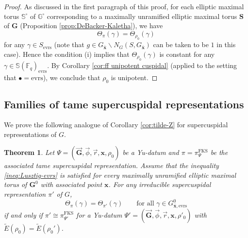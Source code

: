 \documentclass{amsart}
\newcommand{\evrs}{\mathrm{evrs}}
\newcommand{\FKS}{\mathrm{FKS}}
\newcommand{\x}{\mathbf{x}}
\newcommand{\F}{\mathbb{F}}
\newcommand{\bbS}{\mathbb{S}}
\newcommand{\bbG}{\mathbb{G}}
\newcommand{\bfG}{\mathbf{G}}
\newcommand{\bfS}{\mathbf{S}}
\theoremstyle{plain}
\newtheorem{theorem}[thm]{Theorem}
\theoremstyle{definition}
\theoremstyle{remark}
\theoremstyle{theorem}
\begin{document}
\begin{proof}
As discussed in the first paragraph of this proof, for each elliptic maximal torus $\bbS^{\circ}$ of $\bbG^{\circ}$ corresponding to a maximally unramified elliptic maximal torus $\bfS$ of $\bfG$ (Proposition \ref{prop:DeBacker-Kaletha}), we have
\[
\Theta_{\pi}(\gamma)
=
\Theta_{\rho_{0}}(\gamma)
\]
for any $\gamma\in S_{\evrs}$ (note that $g\in G_{\bar{\x}}\backslash N_{G}(S,G_{\bar{\x}})$ can be taken to be $1$ in this case).
Hence the condition (i) implies that $\Theta_{\rho_{0}}(\gamma)$ is constant for any $\gamma\in\bbS(\F_{q})_{\evrs}$.
By Corollary \ref{cor:ff unipotent cuspidal} (applied to the setting that $\bullet = \evrs$), we conclude that $\rho_{0}$ is unipotent.
\end{proof}

\subsection{Families of tame supercuspidal representations}

We prove the following analogue of Corollary \ref{cor:tilde-Z} for supercuspidal representations of $G$.

\begin{theorem}\label{thm:p-adic E}
Let $\Psi=(\vec{\bfG},\vec{\phi},\vec{r},\x,\rho_{0})$ be a Yu-datum and $\pi=\pi_{\Psi}^{\FKS}$ be the associated tame supercuspidal representation.
Assume that the inequality \eqref{ineq:Lusztig-evrs} is satisfied for every maximally unramified elliptic maximal torus of $\bfG^{0}$ with associated point $\x$.
For any irreducible supercuspidal representation $\pi'$ of $G$, 
\begin{equation*}
\Theta_\pi(\gamma) = \Theta_{\pi'}(\gamma) \qquad \text{for all $\gamma\in G^{0}_{\bar{\x},\evrs}$}
\end{equation*}
if and only if $\pi'\cong\pi_{\Psi'}^{\FKS}$ for a Yu-datum $\Psi'=(\vec{\bfG},\vec{\phi},\vec{r},\x,\rho'_{0})$ with $\tilde E(\rho_0) = \tilde E(\rho_0')$.
\end{theorem}
\end{document}
